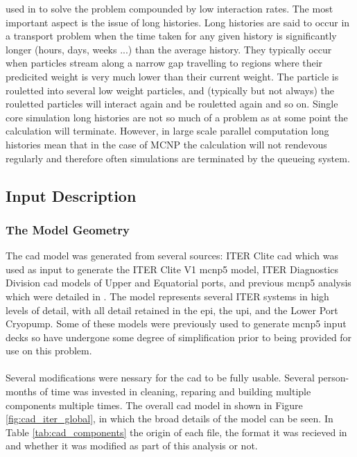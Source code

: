 \documentclass[12pt]{article}
\begin{document}
used in to solve the problem compounded by low interaction rates. The most 
important aspect is the issue of long histories. Long histories are said to 
occur in a transport problem when the time taken for any given history is 
significantly longer (hours, days, weeks ...) than the average history. They 
typically occur when particles stream along a narrow gap travelling to regions
where their predicited weight is very much lower than their current weight. The 
particle is rouletted into several low weight particles, and (typically but not
always) the rouletted particles will interact again and be rouletted again and 
so on. Single core  simulation long histories are not so much of a problem as 
at some point the calculation will terminate. However, in large scale parallel 
computation long histories mean that in the case of MCNP the calculation will
not rendevous regularly and therefore often simulations are terminated by the 
queueing system. 


\subsection{Input Description}
\subsubsection{The Model Geometry}
The \gls{cad} model was generated from several sources: ITER Clite \gls{cad}
which was used as input to generate the ITER Clite V1 \gls{mcnp5} model, ITER
Diagnostics Division \gls{cad} models of Upper and Equatorial ports, and
previous \gls{mcnp5} analysis which were detailed in \cite{cad_origination}. The
model represents several ITER systems in high levels of detail, with all detail
retained in the \gls{epi}, the  \gls{upi}, and the Lower Port Cryopump. Some of
these models were previously used to generate \gls{mcnp5} input decks so have
undergone some degree of simplification prior to being provided for use on this 
problem.
\\
\\
Several modifications were nessary for the \gls{cad} to be fully usable. Several
person-months of time was invested in cleaning, reparing and building multiple
components multiple times. The overall \gls{cad} model in shown in Figure 
\ref{fig:cad_iter_global}, in which the broad details of the model can be seen. In
Table \ref{tab:cad_components} the origin of each file, the format it was recieved
in and whether it was modified as part of this analysis or not.
\end{document}
